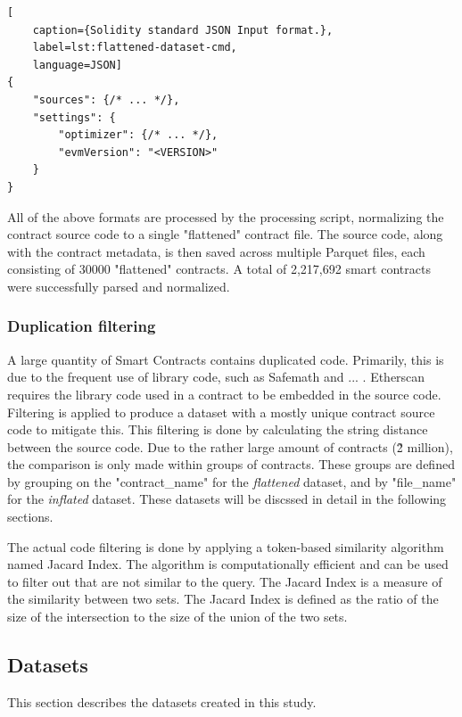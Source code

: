 \begin{lstlisting}[
    caption={Solidity standard JSON Input format.},
    label=lst:flattened-dataset-cmd,
    language=JSON]
{
    "sources": {/* ... */},
    "settings": {
        "optimizer": {/* ... */},
        "evmVersion": "<VERSION>"
    }
}
\end{lstlisting}

All of the above formats are processed by the processing script, normalizing the contract source code to a single "flattened" contract file. The source code, along with the contract metadata, is then saved across multiple Parquet files, each consisting of 30000 "flattened" contracts. A total of 2,217,692 smart contracts were successfully parsed and normalized.

\subsubsection{Duplication filtering}
\label{sec:duplication-filtering}
A large quantity of Smart Contracts contains duplicated code. Primarily, this is due to the frequent use of library code, such as Safemath and ... . Etherscan requires the library code used in a contract to be embedded in the source code. Filtering is applied to produce a dataset with a mostly unique contract source code to mitigate this. This filtering is done by calculating the string distance between the source code. Due to the rather large amount of contracts (\~2 million), the comparison is only made within groups of contracts. These groups are defined by grouping on the "contract\_name" for the \textit{flattened} dataset, and by "file\_name" for the \textit{inflated} dataset. These datasets will be discssed in detail in the following sections.

The actual code filtering is done by applying a token-based similarity algorithm named Jacard Index. The algorithm is computationally efficient and can be used to filter out  that are not similar to the query. The Jacard Index is a measure of the similarity between two sets. The Jacard Index is defined as the ratio of the size of the intersection to the size of the union of the two sets.


\subsection{Datasets}
\label{sec:datasets}
This section describes the datasets created in this study.

